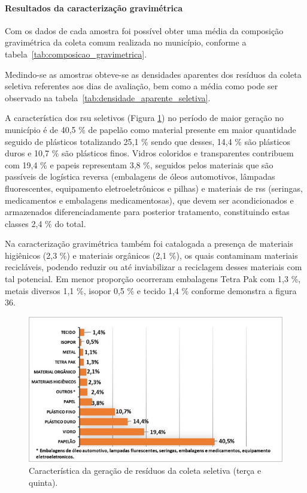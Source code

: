 	
	
	\paragraph{\textbf{Resultados da caracterização gravimétrica}}
	
	Com os dados de cada amostra foi possível obter uma média da composição gravimétrica da coleta comum realizada no município, conforme a tabela~\ref{tab:composicao_gravimetrica}.
	
	
	
	Medindo-se as amostras obteve-se as densidades aparentes dos resíduos da coleta seletiva referentes aos dias de avaliação, bem como a média como pode ser observado na tabela~\ref{tab:densidade_aparente_seletiva}.
	
	
	
	A característica dos \gls{rsu} seletivos (Figura \ref{fig:image050}) no período de maior geração no município é de 40,5 \% de papelão como material presente em maior quantidade seguido de plásticos totalizando 25,1 \% sendo que desses, 14,4 \% são plásticos duros e 10,7 \% são plásticos finos. Vidros coloridos e transparentes contribuem com 19,4 \% e papeis representam 3,8 \%, seguidos pelos materiais que são passíveis de logística reversa (embalagens de óleos automotivos, lâmpadas fluorescentes, equipamento eletroeletrônicos e pilhas) e materiais de \gls{rss} (seringas, medicamentos e embalagens medicamentosas), que devem ser acondicionados e armazenados diferenciadamente para posterior tratamento, constituindo estas classes 2,4 \% do total. 
	
	Na caracterização gravimétrica também foi catalogada a presença de materiais higiênicos (2,3 \%) e materiais orgânicos (2,1 \%), os quais contaminam materiais recicláveis, podendo reduzir ou até inviabilizar a reciclagem desses materiais com tal potencial. Em menor proporção ocorreram embalagens Tetra Pak com 1,3 \%, metais diversos 1,1 \%, isopor 0,5 \% e tecido 1,4 \% conforme demonstra a figura 36.
	
	\begin{figure}
		\centering
		\includegraphics[width=0.75\linewidth]{produtos/prodtres/image050}
		\caption{Característica da geração de resíduos da coleta seletiva (terça e quinta).}
		\label{fig:image050}
	\end{figure}

